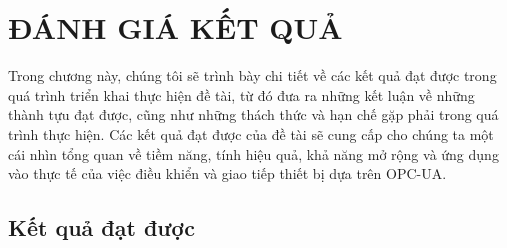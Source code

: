 \chapter{ĐÁNH GIÁ KẾT QUẢ}
Trong chương này, chúng tôi sẽ trình bày chi tiết về các kết quả đạt được trong quá trình triển khai thực hiện đề tài, từ đó đưa ra những kết luận về những thành tựu đạt được, cũng như những thách thức và hạn chế gặp phải trong quá trình thực hiện. Các kết quả đạt được của đề tài sẽ cung cấp cho chúng ta một cái nhìn tổng quan về tiềm năng, tính hiệu quả, khả năng mở rộng và ứng dụng vào thực tế của việc điều khiển và giao tiếp thiết bị dựa trên OPC-UA. 

\section{Kết quả đạt được}
